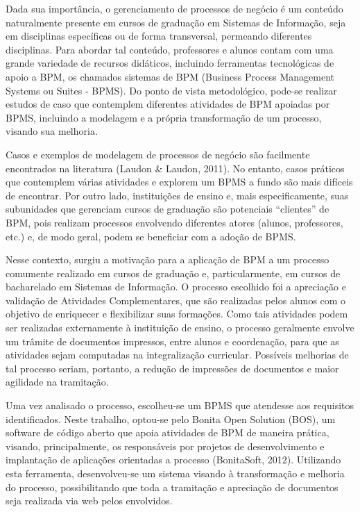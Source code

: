 \documentclass[12pt]{article}
\begin{document}
Dada sua importância, o gerenciamento de processos de negócio é um conteúdo naturalmente presente em cursos de graduação em Sistemas de Informação, seja em disciplinas específicas ou de forma transversal, permeando diferentes disciplinas. Para abordar tal conteúdo, professores e alunos contam com uma grande variedade de recursos didáticos, incluindo ferramentas tecnológicas de apoio a BPM, os chamados sistemas de BPM (Business Process Management Systems ou Suites - BPMS). Do ponto de vista metodológico, pode-se realizar estudos de caso que contemplem diferentes atividades de BPM apoiadas por BPMS, incluindo a modelagem e a própria transformação de um processo, visando sua melhoria.

Casos e exemplos de modelagem de processos de negócio são facilmente encontrados na literatura (Laudon \& Laudon, 2011). No entanto, casos práticos que contemplem várias atividades e explorem um BPMS a fundo são mais difíceis de encontrar. Por outro lado, instituições de ensino e, mais especificamente, suas subunidades que gerenciam cursos de graduação são potenciais “clientes” de BPM, pois realizam processos envolvendo diferentes atores (alunos, professores, etc.) e, de modo geral,  podem se beneficiar com a adoção de BPMS.

Nesse contexto, surgiu a motivação para a aplicação de BPM a um processo comumente realizado em cursos de graduação e, particularmente, em cursos de bacharelado em Sistemas de Informação. O processo escolhido foi a apreciação e validação de Atividades Complementares, que são realizadas pelos alunos com o objetivo de enriquecer e flexibilizar suas formações. Como tais atividades podem ser realizadas externamente à instituição de ensino, o processo geralmente envolve um trâmite de documentos impressos, entre alunos e coordenação, para que as atividades sejam computadas na integralização curricular. Possíveis melhorias de tal processo seriam, portanto, a redução de impressões de documentos e maior agilidade na tramitação.

Uma vez analisado o processo, escolheu-se um BPMS que atendesse aos requisitos identificados. Neste trabalho, optou-se pelo Bonita Open Solution (BOS), um software de código aberto que apoia atividades de BPM de maneira  prática, visando, principalmente, os  responsáveis  por projetos de desenvolvimento e implantação de aplicações orientadas a processo (BonitaSoft, 2012). Utilizando esta ferramenta, desenvolveu-se um sistema visando à transformação e melhoria do processo, possibilitando que toda a tramitação e apreciação de documentos seja realizada via web pelos envolvidos.
\end{document}
